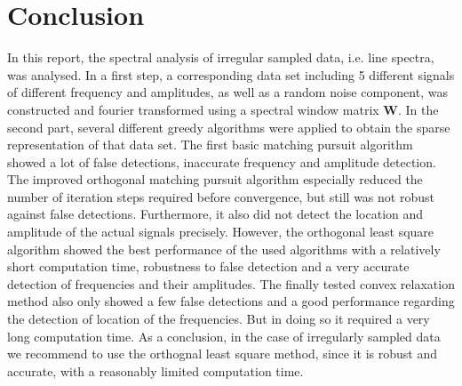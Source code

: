 \section{Conclusion}
In this report, the spectral analysis of irregular sampled data, i.e. line spectra, was analysed. In a first step, a corresponding data set including 5 different signals of different frequency and amplitudes, as well as a random noise component, was constructed and fourier transformed using a spectral window matrix $\boldsymbol{W}$. In the second part, several different greedy algorithms were applied to obtain the sparse representation of that data set. The first basic matching pursuit algorithm showed a lot of false detections, inaccurate frequency and amplitude detection. The improved orthogonal matching pursuit algorithm especially reduced the number of iteration steps required before convergence, but still was not robust against false detections. Furthermore, it also did not detect the location and amplitude of the actual signals precisely. However, the orthogonal least square algorithm showed the best performance of the used algorithms with a relatively short computation time, robustness to false detection and a very accurate detection of frequencies and their amplitudes. The finally tested convex relaxation method also only showed a few false detections and a good performance regarding the detection of location of the frequencies. But in doing so it required a very long computation time. As a conclusion, in the case of irregularly sampled data we recommend to use the orthognal least square method, since it is robust and accurate, with a reasonably limited computation time.

